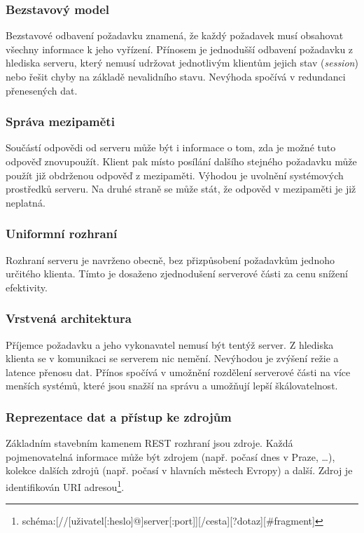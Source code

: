 \subsubsection{Bezstavový model}

Bezstavové odbavení požadavku znamená, že každý požadavek musí obsahovat všechny informace k jeho vyřízení.
Přínosem je jednodušší odbavení požadavku z hlediska serveru, který nemusí udržovat jednotlivým klientům jejich stav (\textit{session}) nebo řešit chyby na základě nevalidního stavu.
Nevýhoda spočívá v redundanci přenesených dat.

\subsubsection{Správa mezipaměti}

Součástí odpovědi od serveru může být i informace o tom, zda je možné tuto odpověď znovupoužít.
Klient pak místo posílání dalšího stejného požadavku může použít již obdrženou odpověď z mezipaměti.
Výhodou je uvolnění systémových prostředků serveru.
Na druhé straně se může stát, že odpověd v mezipaměti je již neplatná.

\subsubsection{Uniformní rozhraní}

Rozhraní serveru je navrženo obecně, bez přizpůsobení požadavkům jednoho určitého klienta.
Tímto je dosaženo zjednodušení serverové části za cenu snížení efektivity. 

\subsubsection{Vrstvená architektura}

Příjemce požadavku a jeho vykonavatel nemusí být tentýž server.
Z hlediska klienta se v komunikaci se serverem nic nemění.
Nevýhodou je zvýšení režie a latence přenosu dat.
Přínos spočívá v umožnění rozdělení serverové části na více menších systémů, které jsou snažší na správu a umožňují lepší škálovatelnost.

\subsubsection{Reprezentace dat a přístup ke zdrojům}

Základním stavebním kamenem REST rozhraní jsou zdroje.
Každá pojmenovatelná informace může být zdrojem (např. počasí dnes v Praze, \ldots), kolekce dalších zdrojů (např. počasí v hlavních městech Evropy) a další.
Zdroj je identifikován URI adresou\footnote{schéma:[//[uživatel[:heslo]@]server[:port]][/cesta][?dotaz][\#fragment]}.




